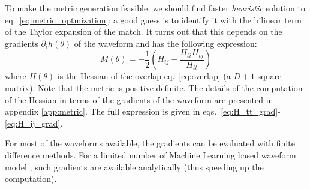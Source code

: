 \documentclass[twocolumn,showpacs,preprintnumbers,nofootinbib,prd,
superscriptaddress,10pt]{revtex4-2}
\begin{document}
To make the metric generation feasible, we should find faster {\it heuristic} solution to eq.~\eqref{eq:metric_optmization}: a good guess is to identify it with the bilinear term of the Taylor expansion of the match.
It turns out that this depends on the gradients $\partial_i h(\theta)$ of the waveform and has the following expression:
\begin{equation}\label{eq:metric_expression}
	M(\theta) = - \frac{1}{2} \left( H_{ij} - \frac{H_{ti}H_{tj}}{H_{tt}} \right)
\end{equation}
where $H(\theta)$ is the Hessian of the overlap eq.~\eqref{eq:overlap} (a $D+1$ square matrix). Note that the metric is positive definite.
The details of the computation of the Hessian in terms of the gradients of the waveform are presented in appendix \ref{app:metric}.
The full expression is given in eqs.~\eqref{eq:H_tt_grad}-\eqref{eq:H_ij_grad}.

For most of the waveforms available, the gradients can be evaluated with finite difference methods. For a limited number of Machine Learning based waveform model \cite{something}, such gradients are available analytically (thus speeding up the computation).

\end{document}
